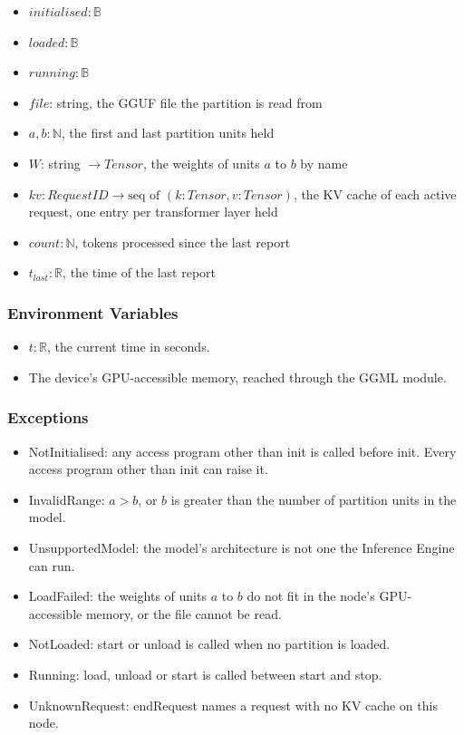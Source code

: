 \documentclass[12pt, titlepage]{article}
\begin{document}
\begin{itemize}
  \item $\mathit{initialised}: \mathbb{B}$
  \item $\mathit{loaded}: \mathbb{B}$
  \item $\mathit{running}: \mathbb{B}$
  \item $\mathit{file}$: string, the GGUF file the partition is read from
  \item $a, b: \mathbb{N}$, the first and last partition units held
  \item $W$: string $\to \mathit{Tensor}$, the weights of units $a$ to $b$ by
    name
  \item $\mathit{kv}: \mathit{RequestID} \to \text{seq of } (k: \mathit{Tensor},
    v: \mathit{Tensor})$, the KV cache of each active request, one entry per
    transformer layer held
  \item $\mathit{count}: \mathbb{N}$, tokens processed since the last
    report
  \item $t_\mathit{last}: \mathbb{R}$, the time of the last report
\end{itemize}

\subsubsection{Environment Variables}

\begin{itemize}
  \item $t: \mathbb{R}$, the current time in seconds.
  \item The device's GPU-accessible memory, reached through the GGML module.
\end{itemize}

\subsubsection{Exceptions}

\begin{itemize}
  \item NotInitialised: any access program other than init is called before
    init. Every access program other than init can raise it.
  \item InvalidRange: $a > b$, or $b$ is greater than the number of partition
    units in the model.
  \item UnsupportedModel: the model's architecture is not one the Inference
    Engine can run.
  \item LoadFailed: the weights of units $a$ to $b$ do not fit in the node's
    GPU-accessible memory, or the file cannot be read.
  \item NotLoaded: start or unload is called when no partition is loaded.
  \item Running: load, unload or start is called between start and stop.
  \item UnknownRequest: endRequest names a request with no KV cache on this
    node.
\end{itemize}
\end{document}
